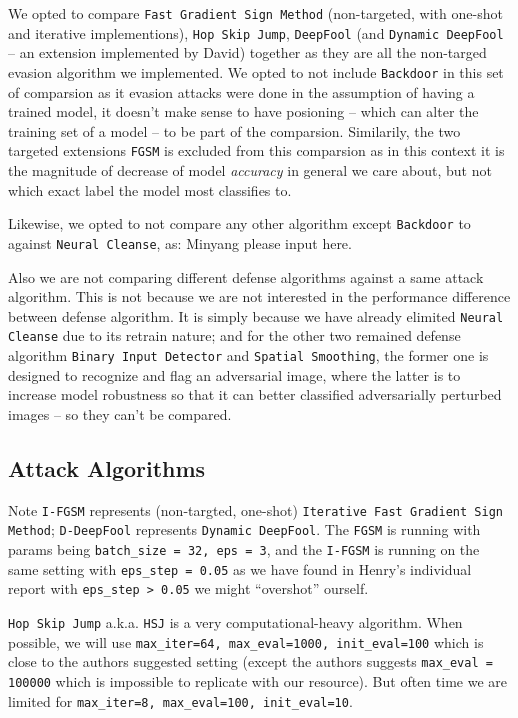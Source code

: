\documentclass[11pt]{article}
\newcommand{\ilc}{\texttt}
\begin{document}
We opted to compare \ilc{Fast Gradient Sign Method} (non-targeted, with one-shot and iterative implementions), \ilc{Hop Skip Jump}, \ilc{DeepFool} (and \ilc{Dynamic DeepFool} -- an extension implemented by David) together as they are all the non-targed evasion algorithm we implemented. We opted to not include \ilc{Backdoor} in this set of comparsion as it evasion attacks were done in the assumption of having a trained model, it doesn't make sense to have posioning -- which can alter the training set of a model -- to be part of the comparsion. Similarily, the two targeted extensions \ilc{FGSM} is excluded from this comparsion as in this context it is the magnitude of decrease of model \textit{accuracy} in general we care about, but not which exact label the model most classifies to.

Likewise, we opted to not compare any other algorithm except \ilc{Backdoor} to against \ilc{Neural Cleanse}, as: Minyang please input here.

Also we are not comparing different defense algorithms against a same attack algorithm. This is not because we are not interested in the performance difference between defense algorithm. It is simply because we have already elimited \ilc{Neural Cleanse} due to its retrain nature; and for the other two remained defense algorithm \ilc{Binary Input Detector} and \ilc{Spatial Smoothing}, the former one is designed to recognize and flag an adversarial image, where the latter is to increase model robustness so that it can better classified adversarially perturbed images -- so they can't be compared.


\subsection{Attack Algorithms}\label{attack_algo}

Note \ilc{I-FGSM} represents (non-targted, one-shot) \ilc{Iterative Fast Gradient Sign Method};  \ilc{D-DeepFool} represents \ilc{Dynamic DeepFool}. The \ilc{FGSM} is running with params being \ilc{batch\_size = 32, eps = 3}, and the \ilc{I-FGSM} is running on the same setting with \ilc{eps\_step = 0.05} as we have found in Henry's individual report with \ilc{eps\_step > 0.05} we might ``overshot'' ourself. \newline

\ilc{Hop Skip Jump} a.k.a. \ilc{HSJ} is a very computational-heavy algorithm. When possible, we will use \ilc{max\_iter=64, max\_eval=1000, init\_eval=100} which is close to the authors suggested setting (except the authors suggests \ilc{max\_eval = 100000} which is impossible to replicate with our resource). But often time we are limited for \ilc{max\_iter=8, max\_eval=100, init\_eval=10}. \newline
\end{document}
